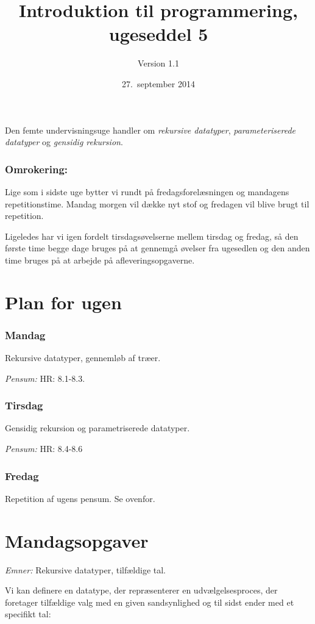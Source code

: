 \documentclass[a4paper,12pt]{article}
\title{Introduktion til programmering, ugeseddel 5}
\author{Version 1.1}%
\date{27.\ september 2014}
\begin{document}
\maketitle{} Den femte undervisningsuge handler om \textit{rekursive
  datatyper}, \textit{parameteriserede datatyper} og \textit{gensidig
  rekursion}.


\subsubsection*{Omrokering:}
Lige som i sidste uge bytter vi rundt på fredagsforelæsningen og
mandagens repetitionstime.  Mandag morgen vil dække nyt stof og
fredagen vil blive brugt til repetition.

Ligeledes har vi igen fordelt tirsdagsøvelserne mellem tirsdag og
fredag, så den første time begge dage bruges på at gennemgå øvelser
fra ugesedlen og den anden time bruges på at arbejde på
afleveringsopgaverne.

\section{Plan for ugen}
\label{sec:pensum-og-plan}

\subsubsection*{Mandag}
Rekursive datatyper, gennemløb af træer.

\textit{Pensum:} HR: 8.1-8.3.

\subsubsection*{Tirsdag}
Gensidig rekursion og parametriserede datatyper.

\textit{Pensum:} HR: 8.4-8.6

\subsubsection*{Fredag}
Repetition af ugens pensum. Se ovenfor.

\newpage
\section{Mandagsopgaver}
\label{sec:mandagsopgaver}

\textit{Emner:} Rekursive datatyper, tilfældige tal.

Vi kan definere en datatype, der repræsenterer en udvælgelsesproces,
der foretager tilfældige valg med en given sandsynlighed og til sidst
ender med et specifikt tal:
\end{document}
